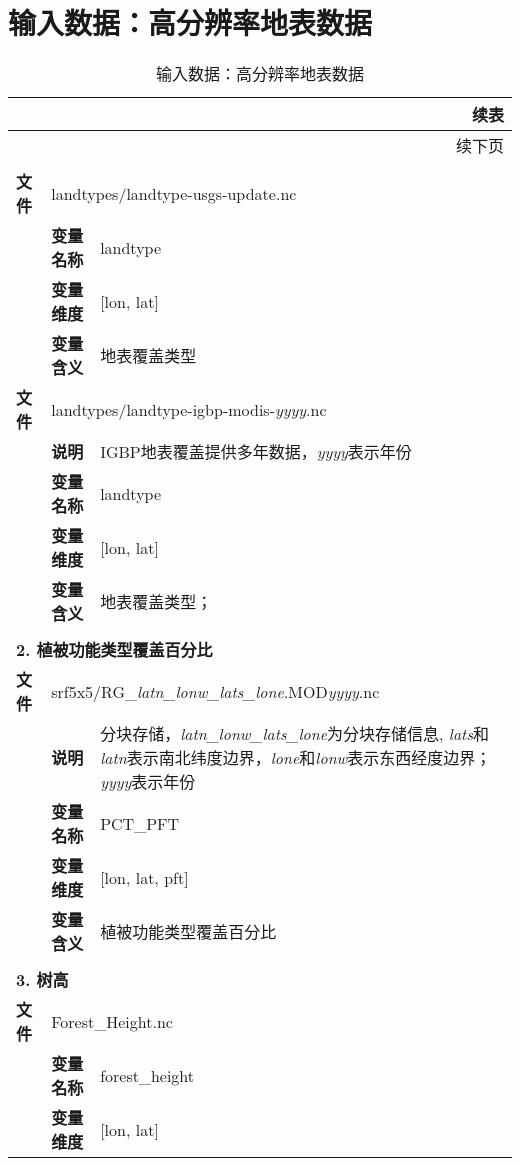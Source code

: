 \documentclass[a4paper,12pt,twoside]{article}
\begin{document}
\section{输入数据：高分辨率地表数据} \label{landdata}
\begin{longtable}{llp{}}
\caption{输入数据：高分辨率地表数据}\\

\toprule
\endfirsthead
\multicolumn{3}{r}{{续表}} \\
\toprule
\endhead
\midrule
\multicolumn{3}{r}{{续下页}} \\
\endfoot
\bottomrule
\endlastfoot

\multicolumn{3}{l}{\textbf{1. 地表覆盖类型}} \\
\midrule
\textbf{文件} & \multicolumn{2}{l}{landtypes/landtype-usgs-update.nc} \\
\cline{2-3}
&\textbf{变量名称} & landtype \\
&\textbf{变量维度} & {[}lon, lat{]}\\
&\textbf{变量含义} & 地表覆盖类型 \\
\cline{1-3}
\textbf{文件} & \multicolumn{2}{l}{landtypes/landtype-igbp-modis-\textit{yyyy}.nc} \\
&\textbf{说明} & IGBP地表覆盖提供多年数据，\textit{yyyy}表示年份 \\
\cline{2-3}
&\textbf{变量名称} & landtype \\
&\textbf{变量维度} & {[}lon, lat{]}\\
&\textbf{变量含义} & 地表覆盖类型； \\
\midrule
\vspace{2\baselineskip}\\
\multicolumn{3}{l}{\textbf{2. 植被功能类型覆盖百分比}} \\
\cline{1-3}
\textbf{文件} & \multicolumn{2}{l}{srf5x5/RG\_\textit{latn\_lonw\_lats\_lone}.MOD\textit{yyyy}.nc} \\
& \textbf{说明} & 分块存储，\textit{latn\_lonw\_lats\_lone}为分块存储信息,  \textit{lats}和\textit{latn}表示南北纬度边界，\textit{lone}和\textit{lonw}表示东西经度边界；\textit{yyyy}表示年份 \\
\cline{2-3}
 & \textbf{变量名称} & PCT\_PFT \\
 & \textbf{变量维度} & {[}lon, lat, pft{]} \\
 & \textbf{变量含义} & 植被功能类型覆盖百分比 \\

\midrule
\vspace{2\baselineskip}\\
 \multicolumn{3}{l}{\textbf{3. 树高}} \\
\cline{1-3}
\textbf{文件} & \multicolumn{2}{l}{Forest\_Height.nc} \\
\cline{2-3}
& \textbf{变量名称} & forest\_height \\
& \textbf{变量维度} & {[}lon, lat{]} \\


\end{longtable}
\end{document}
